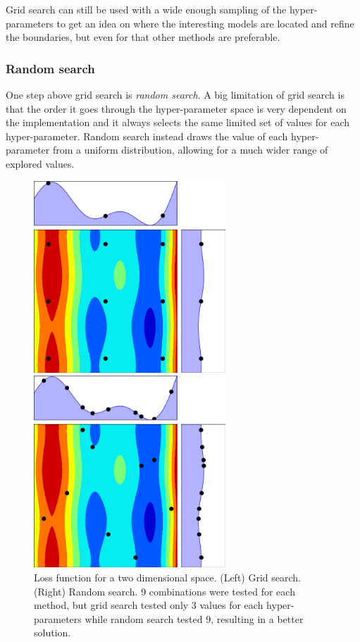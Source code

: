 Grid search can still be used with a wide enough sampling of the hyper-parameters to get an idea on where the interesting models are located and refine the boundaries, but even for that other methods are preferable.

\subsubsection{Random search}

One step above grid search is \textit{random search}. A big limitation of grid search is that the order it goes through the hyper-parameter space is very dependent on the implementation and it always selects the same limited set of values for each hyper-parameter. Random search instead draws the value of each hyper-parameter from a uniform distribution, allowing for a much wider range of explored values.

\begin{figure}[htb]
	\begin{minipage}[b]{.49\linewidth}
		\centering
		\centerline{\includegraphics[width=7.2cm]{img_hyperopt/rs_grid}}
	\end{minipage}
	\begin{minipage}[b]{.49\linewidth}
		\centering
		\centerline{\includegraphics[width=7.2cm]{img_hyperopt/rs_random}}
	\end{minipage}
	\caption{Loss function for a two dimensional space. (Left) Grid search. (Right) Random search. 9 combinations were tested for each method, but grid search tested only 3 values for each hyper-parameters while random search tested 9, resulting in a better solution.}
	\label{fig:rs}
\end{figure}

